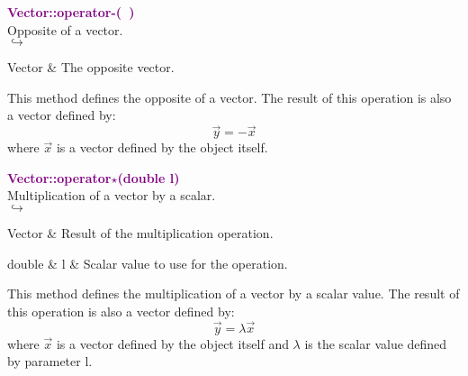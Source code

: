\textcolor{purple}{\textbf{Vector::operator-(~)}}\label{Vector::operator-()}\\
Opposite of a vector.\\ \hspace*{5mm}$\hookrightarrow$
\vspace*{-2em}\begin{tcolorbox}[grow to left by=-1cm, width=\textwidth-1cm,myArgs,tabularx={l|R}]
Vector & The opposite vector.
\end{tcolorbox}

This method defines the opposite of a vector.
The result of this operation is also a vector defined by:
\begin{equation*}
\overrightarrow{y} = - \overrightarrow{x}
\end{equation*}
where $\overrightarrow{x}$ is a vector defined by the object itself.

\textcolor{purple}{\textbf{Vector::operator$\star$(double l)}}\label{Vector::operator*(double l)}\\
Multiplication of a vector by a scalar.\\ \hspace*{5mm}$\hookrightarrow$
\vspace*{-2em}\begin{tcolorbox}[grow to left by=-1cm, width=\textwidth-1cm,myArgs,tabularx={l|R}]
Vector & Result of the multiplication operation.
\end{tcolorbox}

\begin{tcolorbox}[width=\textwidth,myArgs,tabularx={ll|R}]
double & l & Scalar value to use for the operation.
\end{tcolorbox}

This method defines the multiplication of a vector by a scalar value.
The result of this operation is also a vector defined by:
\begin{equation*}
\overrightarrow{y} = \lambda \overrightarrow{x}
\end{equation*}
where $\overrightarrow{x}$ is a vector defined by the object itself and $\lambda$ is the scalar value defined by parameter l.

